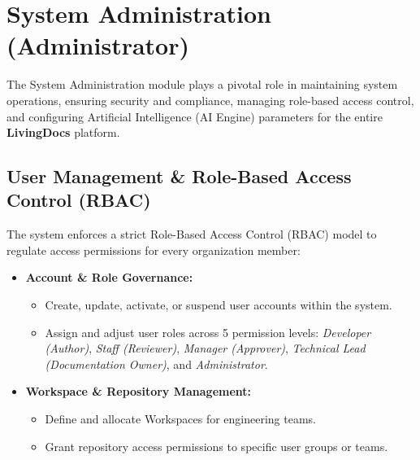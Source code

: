 \section{System Administration (Administrator)}

The System Administration module plays a pivotal role in maintaining system operations, ensuring security and compliance, managing role-based access control, and configuring Artificial Intelligence (AI Engine) parameters for the entire \textbf{LivingDocs} platform.

\subsection{User Management \& Role-Based Access Control (RBAC)}
The system enforces a strict Role-Based Access Control (RBAC) model to regulate access permissions for every organization member:
\begin{itemize}
    \item \textbf{Account \& Role Governance:}
    \begin{itemize}
        \item Create, update, activate, or suspend user accounts within the system.
        \item Assign and adjust user roles across 5 permission levels: \textit{Developer (Author)}, \textit{Staff (Reviewer)}, \textit{Manager (Approver)}, \textit{Technical Lead (Documentation Owner)}, and \textit{Administrator}.
    \end{itemize}
    \item \textbf{Workspace \& Repository Management:}
    \begin{itemize}
        \item Define and allocate Workspaces for engineering teams.
        \item Grant repository access permissions to specific user groups or teams.
    \end{itemize}
\end{itemize}

